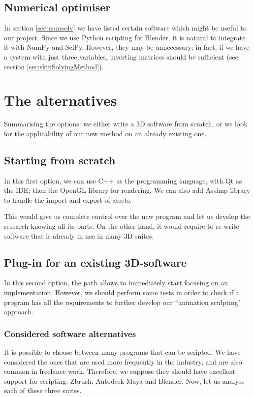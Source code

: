 \documentclass[12pt,twoside]{report}
\begin{document}
\subsection{Numerical optimiser}
In section \ref{sec:numsolv} we have listed certain software which might be useful to our project. Since we use Python scripting for Blender, it is natural to integrate it with NumPy and SciPy. However, they may be unnecessary: in fact, if we have a system with just three variables, inverting matrices should be sufficient (see section \ref{sec:skinSolvingMethod}).

\section{The alternatives}
Summarising the options: we either write a 3D software from scratch, or we look for the applicability of our new method on an already existing one.

\subsection{Starting from scratch}
\label{sec:framework_from_scratch}
In this first option, we can use C++ as the programming language, with Qt as the IDE; then the OpenGL library for rendering. We can also add Assimp library to handle the import and export of assets.

This would give us complete control over the new program and let us develop the research knowing all its parts. On the other hand, it would require to re-write software that is already in use in many 3D suites.

\subsection{Plug-in for an existing 3D-software}

In this second option, the path allows to immediately start focusing on an implementation. However, we should perform some tests in order to check if a program has all the requirements to further develop our ``animation sculpting" approach.

\subsubsection{Considered software alternatives}
It is possible to choose between many programs that can be scripted. We have considered the ones that are used more frequently in the industry, and are also common in freelance work. Therefore, we suppose they should have excellent support for scripting: Zbrush, Autodesk Maya and Blender. Now, let us analyse each of these three suites.
\end{document}
